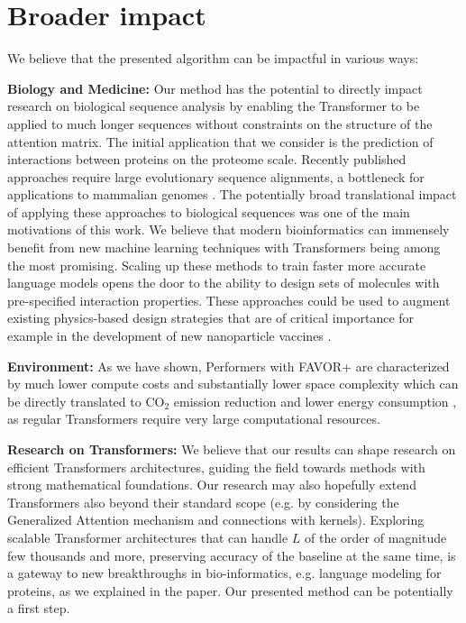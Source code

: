 \section{Broader impact}
\label{sec:broader_impact}
We believe that the presented algorithm can be impactful in various ways:

\textbf{Biology and Medicine:} Our method has the potential to directly impact research on biological sequence analysis by enabling the Transformer to be applied to much longer sequences without constraints on the structure of the attention matrix. The initial application that we consider is the prediction of interactions between proteins on the proteome scale. Recently published approaches require large evolutionary sequence alignments, a bottleneck for applications to mammalian genomes \citep{cong2019protein}. The potentially broad translational impact of applying these approaches to biological sequences was one of the main motivations of this work. We believe that modern bioinformatics can immensely benefit from new machine learning techniques with Transformers being among the most promising. Scaling up these methods to train faster more accurate language models opens the door to the ability to design sets of molecules with pre-specified interaction properties. These approaches could be used to augment existing physics-based design strategies that are of critical importance for example in the development of new nanoparticle vaccines \citep{marcandalli2019induction}.  

\textbf{Environment:} As we have shown, Performers with FAVOR+ are characterized by much lower compute costs and substantially lower space complexity which can be directly translated to $\mathrm{CO}_{2}$ emission reduction \citep{co2} and lower energy consumption \citep{energy}, as regular Transformers require very large computational resources.

\textbf{Research on Transformers:} We believe that our results can shape research on efficient Transformers architectures, guiding the field towards methods with strong mathematical foundations. Our research may also hopefully extend Transformers also beyond their standard scope (e.g. by considering the Generalized Attention mechanism and connections with kernels). Exploring scalable Transformer architectures that can handle $L$ of the order of magnitude few thousands and more, preserving accuracy of the baseline at the same time, is a gateway to new breakthroughs in bio-informatics, e.g. language modeling for proteins, as we explained in the paper. Our presented method can be potentially a first step.


